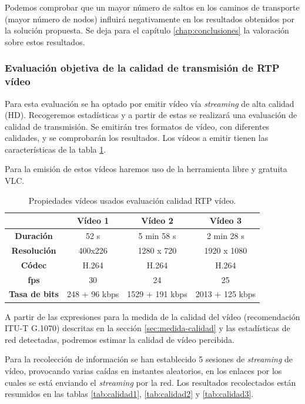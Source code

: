 \documentclass[a4paper,11pt]{book}
\begin{document}
Podemos comprobar que un mayor número de saltos en los caminos de transporte (mayor número de nodos) influirá negativamente en los resultados obtenidos por la solución propuesta. Se deja para el capítulo \ref{chap:conclusiones} la valoración sobre estos resultados.

%
\subsubsection{Evaluación objetiva de la calidad de transmisión de \ac{RTP} vídeo}\label{subsub:video}
Para esta evaluación se ha optado por emitir vídeo vía \textit{streaming} de alta calidad (\ac{HD}). Recogeremos estadísticas y a partir de estas se realizará una evaluación de calidad de transmisión. Se emitirán tres formatos de vídeo, con diferentes calidades, y se comprobarán los resultados. Los vídeos a emitir tienen las características de la tabla \ref{videos}.

Para la emisión de estos vídeos haremos uso de la herramienta libre y gratuita VLC.

\begin{table}[tb]
\centering
\begin{tabular}{|c|c|c|c|}
\hline
                   & {\bf Vídeo 1} & {\bf Vídeo 2} & {\bf Vídeo 3} \\ \hline
{\bf Duración}     & 52 s          & 5 min 58 s    & 2 min 28 s    \\ \hline
{\bf Resolución}   & 400x226       & 1280 x 720    & 1920 x 1080   \\ \hline
{\bf Códec}        & H.264         & H.264         & H.264         \\ \hline
{\bf fps}          & 30            & 24            & 25            \\ \hline
{\bf Tasa de bits} & 248 + 96 kbps      & 1529 + 191 kbps     & 2013 + 125 kbps     \\ \hline
\end{tabular}
\caption{Propiedades vídeos usados evaluación calidad \ac{RTP} vídeo.}
\label{videos}
\end{table}


A partir de las expresiones para la medida de la calidad del vídeo (recomendación ITU-T G.1070) descritas en la sección \ref{sec:medida-calidad}  y las estadísticas de red detectadas, podremos estimar la calidad de vídeo percibida.

Para la recolección de información se han establecido 5 sesiones de \emph{streaming} de vídeo, provocando varias caídas en instantes aleatorios, en los enlaces por los cuales se está enviando el \emph{streaming} por la red. Los resultados recolectados están resumidos en las tablas \ref{tab:calidad1}, \ref{tab:calidad2} y \ref{tab:calidad3}.
\end{document}
